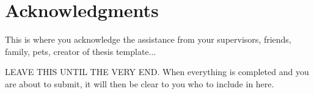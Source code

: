 %
\chapter*{Acknowledgments}
%
This is where you acknowledge the assistance from your supervisors, friends, family, pets, creator of thesis template...

LEAVE THIS UNTIL THE VERY END. When everything is completed and you are about to submit, it will then be clear to you who to include in here.
%
%
\cleardoublepage
%